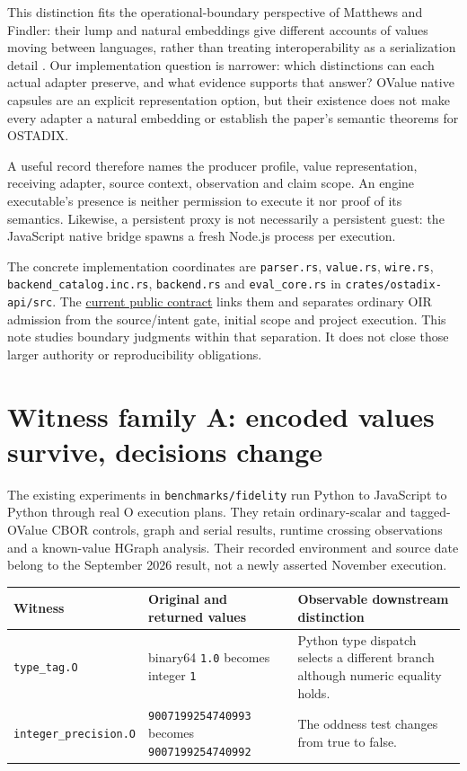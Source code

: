 \documentclass[11pt]{article}
\begin{document}
This distinction fits the operational-boundary perspective of Matthews and Findler: their lump and natural embeddings give different accounts of values moving between languages, rather than treating interoperability as a serialization detail \cite{matthews2007}. Our implementation question is narrower: which distinctions can each actual adapter preserve, and what evidence supports that answer? OValue native capsules are an explicit representation option, but their existence does not make every adapter a natural embedding or establish the paper's semantic theorems for OSTADIX.

A useful record therefore names the producer profile, value representation, receiving adapter, source context, observation and claim scope. An engine executable's presence is neither permission to execute it nor proof of its semantics. Likewise, a persistent proxy is not necessarily a persistent guest: the JavaScript native bridge spawns a fresh Node.js process per execution.

The concrete implementation coordinates are \texttt{parser.rs}, \texttt{value.rs}, \texttt{wire.rs}, \texttt{backend\_catalog.inc.rs}, \texttt{backend.rs} and \texttt{eval\_core.rs} in \texttt{crates/ostadix-api/src}. The \href{../CURRENT_CONTRACT.md}{current public contract} links them and separates ordinary OIR admission from the source/intent gate, initial scope and project execution. This note studies boundary judgments within that separation. It does not close those larger authority or reproducibility obligations.

\clearpage

\section{Witness family A: encoded values survive, decisions change}

The existing experiments in \texttt{benchmarks/fidelity} run Python to JavaScript to Python through real O execution plans. They retain ordinary-scalar and tagged-OValue CBOR controls, graph and serial results, runtime crossing observations and a known-value HGraph analysis. Their recorded environment and source date belong to the September 2026 result, not a newly asserted November execution.

{\small
\begin{tabularx}{\linewidth}{YYY}
\toprule
Witness & Original and returned values & Observable downstream distinction \\
\midrule
\texttt{type\_tag.O} & binary64 \texttt{1.0} becomes integer \texttt{1} & Python type dispatch selects a different branch although numeric equality holds. \\
\texttt{integer\_precision.O} & \texttt{9007199254740993} becomes \texttt{9007199254740992} & The oddness test changes from true to false. \\
\bottomrule
\end{tabularx}
}
\end{document}
